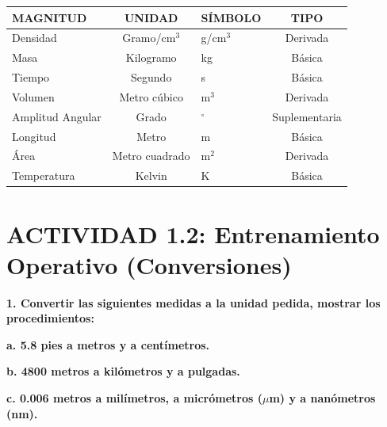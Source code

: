 \documentclass[12pt, letterpaper]{article}
\begin{document}
	\begin{center}
		\renewcommand{\arraystretch}{1.5}
		\begin{tabular}{|l|c|l|c|}
			\hline
			\textbf{MAGNITUD} & \textbf{UNIDAD} & \textbf{SÍMBOLO} & \textbf{TIPO} \\ \hline
			Densidad & Gramo/cm$^3$ & g/cm$^3$ & Derivada \\ \hline
			Masa & Kilogramo & kg & Básica \\ \hline
			Tiempo & Segundo & s & Básica \\ \hline
			Volumen & Metro cúbico & m$^3$ & Derivada \\ \hline
			Amplitud Angular & Grado & $^\circ$ & Suplementaria \\ \hline
			Longitud & Metro & m & Básica \\ \hline
			Área & Metro cuadrado & m$^2$ & Derivada \\ \hline
			Temperatura & Kelvin & K & Básica \\ \hline
		\end{tabular}
	\end{center}
	
	\section*{ACTIVIDAD 1.2: Entrenamiento Operativo (Conversiones)}
	
	\noindent \textbf{1. Convertir las siguientes medidas a la unidad pedida, mostrar los procedimientos:}
	
	\noindent \textbf{a. 5.8 pies a metros y a centímetros.}
	
	\noindent \textbf{b. 4800 metros a kilómetros y a pulgadas.}
	
	\noindent \textbf{c. 0.006 metros a milímetros, a micrómetros ($\mu$m) y a nanómetros (nm).}
	
\end{document}
